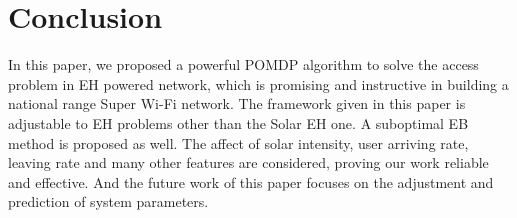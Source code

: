 \documentclass[conference]{IEEEtran}
\begin{document}
\section{Conclusion}
In this paper, we proposed a powerful POMDP algorithm to solve the access problem in EH powered network,
which is promising and instructive in building a national range Super Wi-Fi network.
The framework given in this paper is adjustable to EH problems other than the Solar EH one.
A suboptimal EB method is proposed as well.
The affect of solar intensity, user arriving rate, leaving rate and many other features are considered, 
proving our work reliable and effective.
And the future work of this paper focuses on the adjustment and prediction of system parameters.


\end{document}
